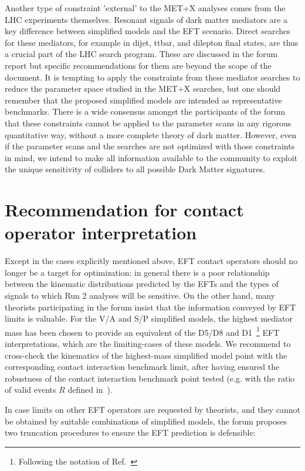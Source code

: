 \documentclass[a4,debug,notitlepage,nobib]{tufte-handout}
\begin{document}
Another type of constraint 'external' to the MET+X analyses comes from
the LHC experiments themselves. Resonant signals of dark matter
mediators are a key difference between simplified models and the EFT
scenario. Direct searches for these mediators, for example in dijet,
ttbar, and dilepton final states, are thus a crucial part of the LHC
search program. These are discussed in the forum report but specific
recommendations for them are beyond the scope of the document.  It is
tempting to apply the constraints from these mediator searches to
reduce the parameter space studied in the MET+X searches, but one
should remember that the proposed simplified models are intended as
representative benchmarks. There is a wide consensus amongst the
participants of the forum that these constraints cannot be applied to
the parameter scans in any rigorous quantitative way, without a more
complete theory of dark matter. However, even if the parameter scans
and the searches are not optimized with those constraints in mind, 
we intend to make all information available to the community to exploit
the unique sensitivity of colliders to all possible 
Dark Matter signatures. 

\section{Recommendation for contact operator interpretation}
\label{sec:eft}

Except in the cases explicitly mentioned above, EFT contact operators
should no longer be a target for optimization: in general there is a
poor relationship between the kinematic distributions predicted by the
EFTs and the types of signals to which Run 2 analyses will be
sensitive. On the other hand, many theorists participating in the
forum insist that the information conveyed by EFT limits is
valuable. %
For the V/A and S/P simplified models, the highest mediator mass has
been chosen to provide an equivalent of the D5/D8 and D1~\footnote{Following 
the notation of Ref.~\cite{Goodman:2010ku}} EFT interpretations, 
which are the limiting-cases of these models. 
We recommend to cross-check the kinematics of the highest-mass simplified model point 
with the corresponding contact interaction benchmark limit, after having ensured 
the robustness of the contact interaction benchmark point tested (e.g. with the ratio 
of valid events $R$ defined in~\cite{Aad:2015zva}). 

In case limits on other EFT operators are requested by theorists, and they
cannot be obtained by suitable combinations of simplified models, the
forum proposes two truncation procedures to ensure the EFT prediction
is defensible:
\end{document}
